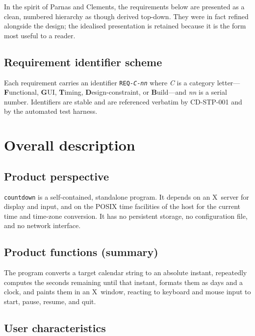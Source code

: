 \documentclass[12pt]{article}
\newcommand{\code}[1]{\texttt{#1}}
\newcommand{\req}[1]{\texttt{#1}}
\begin{document}
In the spirit of Parnas and Clements, the requirements below are presented
as a clean, numbered hierarchy as though derived top-down.  They were in
fact refined alongside the design; the idealised presentation is retained
because it is the form most useful to a reader.

\subsection{Requirement identifier scheme}

Each requirement carries an identifier \req{REQ-\textit{C}-\textit{nn}}
where \textit{C} is a category letter---\textbf{F}unctional,
\textbf{G}UI, \textbf{T}iming, \textbf{D}esign-constraint, or
\textbf{B}uild---and \textit{nn} is a serial number.  Identifiers are
stable and are referenced verbatim by CD-STP-001 and by the automated test
harness.

\section{Overall description}

\subsection{Product perspective}

\code{countdown} is a self-contained, standalone program.  It depends on
an X~server for display and input, and on the POSIX time facilities of the
host for the current time and time-zone conversion.  It has no persistent
storage, no configuration file, and no network interface.

\subsection{Product functions (summary)}

The program converts a target calendar string to an absolute instant,
repeatedly computes the seconds remaining until that instant, formats them
as days and a clock, and paints them in an X~window, reacting to keyboard
and mouse input to start, pause, resume, and quit.

\subsection{User characteristics}
\end{document}
